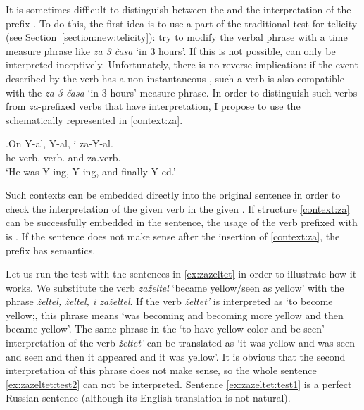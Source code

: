 It is sometimes difficult to distinguish between the  and the  interpretation of the prefix . To do this, the first idea is to use a part of the traditional test for telicity (see Section~\ref{section:new:telicity}): try to modify the verbal phrase with a time measure phrase like \textit{za 3 \v{c}asa} `in 3 hours'. If this is not possible, can only be interpreted inceptively. Unfortunately, there is no reverse implication: if the event described by the  verb has a non-instantaneous , such a verb is also compatible with the \textit{za 3 \v{c}asa} `in 3 hours' measure phrase. In order to distinguish such verbs from \textit{za}-prefixed verbs that have  interpretation, I propose to use the  schematically represented in \ref{context:za}.

\exg.\label{context:za}On Y-al, Y-al, i za-Y-al.\\
he verb. verb. and za.verb.\\
\trans `He was Y-ing, Y-ing, and finally Y-ed.'

Such contexts can be embedded directly into the original sentence in order to check the interpretation of the given verb in the given . If structure \ref{context:za} can be successfully embedded in the sentence, the usage of the verb prefixed with  is . If the sentence does not make sense after the insertion of  \ref{context:za}, the prefix  has  semantics.

Let us run the test with the sentences in \ref{ex:zazeltet} in order to illustrate how it works. We substitute the verb \textit{za\v{z}eltel} `became yellow/seen as yellow' with the phrase \textit{\v{z}eltel, \v{z}eltel, i za\v{z}eltel}. If the verb \textit{\v{z}eltet'} is interpreted as `to become yellow;, this phrase means `was becoming and becoming more yellow and then became yellow'. The same phrase in the `to have yellow color and be seen' interpretation of the verb \textit{\v{z}eltet'} can be translated as `it was yellow and was seen and seen and then it appeared and it was yellow'. It is obvious that the second interpretation of this phrase does not make sense, so the whole sentence \ref{ex:zazeltet:test2} can not be interpreted. Sentence \ref{ex:zazeltet:test1} is a perfect Russian sentence (although its English translation is not natural).

